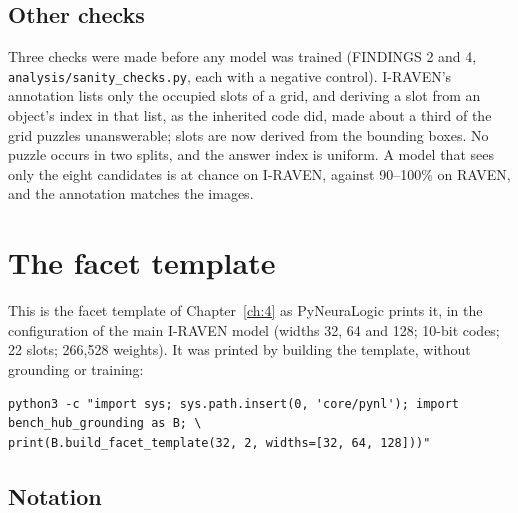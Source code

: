 \section{Other checks}\label{sec:B.4}

Three checks were made before any model was trained (FINDINGS 2 and 4, \texttt{analysis/sanity\_checks.py}, each with a negative control). I-RAVEN's annotation lists only the occupied slots of a grid, and deriving a slot from an object's index in that list, as the inherited code did, made about a third of the grid puzzles unanswerable; slots are now derived from the bounding boxes. No puzzle occurs in two splits, and the answer index is uniform. A model that sees only the eight candidates is at chance on I-RAVEN, against 90–100\% on RAVEN, and the annotation matches the images.

\chapter{The facet template}\label{app:C}

This is the facet template of Chapter~\ref{ch:4} as PyNeuraLogic prints it, in the configuration of the main I-RAVEN model (widths 32, 64 and 128; 10-bit codes; 22 slots; 266,528 weights). It was printed by building the template, without grounding or training:

\begin{Verbatim}[fontsize=\small,breaklines]
python3 -c "import sys; sys.path.insert(0, 'core/pynl'); import bench_hub_grounding as B; \
print(B.build_facet_template(32, 2, widths=[32, 64, 128]))"
\end{Verbatim}

\section{Notation}\label{sec:C.1}

